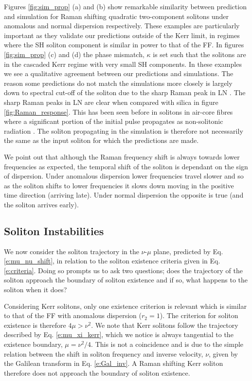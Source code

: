 \documentclass[reprint,
 amsmath,amssymb,
 pra,
]{revtex4-1}
\begin{document}
Figures \ref{fig:sim_prop} (a) and (b) show remarkable similarity between prediction and simulation for Raman shifting quadratic two-component solitons under anomalous and normal dispersion respectively. These examples are particularly important as they validate our predictions outside of the Kerr limit, in regimes where the SH soliton component is similar in power to that of the FF. In figures \ref{fig:sim_prop} (c) and (d) the phase mismatch, $\kappa$ is set such that the solitons are in the cascaded Kerr regime with very small SH components. In these examples we see a qualitative agreement between our predictions and simulations. The reason some predictions do not match the simulations more closely is largely down to spectral cut-off of the soliton due to the sharp Raman peak in LN \cite{Gorbach2008SolitonFibers}. The sharp Raman peaks in LN are clear when compared with silica in figure \ref{fig:Raman_response}. This has been seen before in solitons in air-core fibres where a significant portion of the initial pulse propagates as non-solitonic radiation \cite{Gorbach2008SolitonFibers}. The soliton propagating in the simulation is therefore not necessarily the same as the input soliton for which the predictions are made.

We point out that although the Raman frequency shift is always towards lower frequencies as expected, the temporal shift of the soliton is dependant on the sign of dispersion. Under anomalous dispersion lower frequencies travel slower and so as the soliton shifts to lower frequencies it slows down moving in the positive time direction (arriving late). Under normal dispersion the opposite is true (and the soliton arrives early).

\subsection{ Soliton Instabilities }\label{s:sim_sol_instability}

We now consider the soliton trajectory in the $\nu$-$\mu$ plane, predicted by Eq. \eqref{e:mu_nu_shift}, in relation to the soliton existence criteria given in Eq. \eqref{e:criteria}. Doing so prompts us to ask two questions; does the trajectory of the soliton approach the boundary of soliton existence and if so, what happens to the soliton when it does?

Considering Kerr solitons, only one existence criterion is relevant which is similar to that of the FF with anomalous dispersion ($r_2=1$). The criterion for soliton existence is therefore $4\mu > \nu^2 $. We note that Kerr solitons follow the trajectory described by Eq. \eqref{e:mu_xi_kerr}, which we notice is always tangential to the existence boundary, $\mu=\nu^2/4$. This is not a coincidence and is due to the simple relation between the shift in soliton frequency and inverse velocity, $\nu$, given by the Galilean transform in Eq. \eqref{e:Gal_inv}. A Raman shifting Kerr soliton therefore does not approach the boundary of soliton existence.
\end{document}
